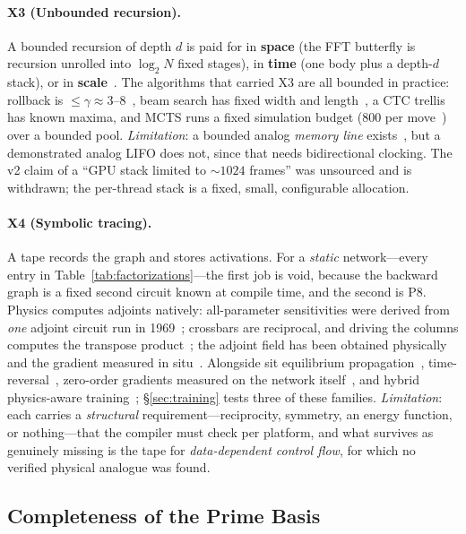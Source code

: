 \documentclass[11pt]{article}
\begin{document}
\paragraph{X3 (Unbounded recursion).} A bounded recursion of depth $d$ is paid for in \textbf{space} (the FFT butterfly is recursion unrolled into $\log_2 N$ fixed stages), in \textbf{time} (one body plus a depth-$d$ stack), or in \textbf{scale}~\cite{friedman2001}. The algorithms that carried X3 are all bounded in practice: rollback is $\le\gamma \approx 3$--$8$~\cite{leviathan2023}, beam search has fixed width and length~\cite{freitag2017}, a CTC trellis has known maxima, and MCTS runs a fixed simulation budget (800 per move~\cite{silver2018}) over a bounded pool. \textit{Limitation}: a bounded analog \textit{memory line} exists~\cite{sangster1969,boyle1970}, but a demonstrated analog LIFO does not, since that needs bidirectional clocking. The v2 claim of a ``GPU stack limited to ${\sim}1024$ frames'' was unsourced and is withdrawn; the per-thread stack is a fixed, small, configurable allocation.

\paragraph{X4 (Symbolic tracing).} A tape records the graph and stores activations. For a \textit{static} network---every entry in Table~\ref{tab:factorizations}---the first job is void, because the backward graph is a fixed second circuit known at compile time, and the second is P8. Physics computes adjoints natively: all-parameter sensitivities were derived from \textit{one} adjoint circuit run in 1969~\cite{director1969}; crossbars are reciprocal, and driving the columns computes the transpose product~\cite{gokmen2016}; the adjoint field has been obtained physically and the gradient measured in situ~\cite{hughes2018}. Alongside sit equilibrium propagation~\cite{scellier2017,dillavou2022,laydevant2024}, time-reversal~\cite{lopezpastor2023}, zero-order gradients measured on the network itself~\cite{cauwenberghs1996,baydin2022}, and hybrid physics-aware training~\cite{wright2022}; \S\ref{sec:training} tests three of these families. \textit{Limitation}: each carries a \textit{structural} requirement---reciprocity, symmetry, an energy function, or nothing---that the compiler must check per platform, and what survives as genuinely missing is the tape for \textit{data-dependent control flow}, for which no verified physical analogue was found.

\subsection{Completeness of the Prime Basis}
\label{sec:completeness}
\end{document}
